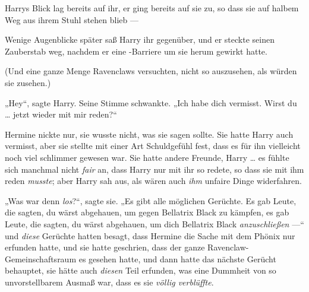 Harrys Blick lag bereits auf ihr, er ging bereits auf sie zu, so dass sie auf halbem Weg aus ihrem Stuhl stehen blieb —

Wenige Augenblicke später saß Harry ihr gegenüber, und er steckte seinen Zauberstab weg, nachdem er eine -Barriere um sie herum gewirkt hatte.

(Und eine ganze Menge Ravenclaws versuchten, nicht so auszusehen, als würden sie zusehen.)

„Hey“, sagte Harry. Seine Stimme schwankte.
„Ich habe dich vermisst. Wirst du … jetzt wieder mit mir reden?“

Hermine nickte nur, sie wusste nicht, was sie sagen sollte. Sie hatte Harry auch vermisst, aber sie stellte mit einer Art Schuldgefühl fest, dass es für ihn vielleicht noch viel schlimmer gewesen war. Sie hatte andere Freunde, Harry … es fühlte sich manchmal nicht \emph{fair} an, dass Harry nur mit ihr so redete, so dass sie mit ihm reden \emph{musste}; aber Harry sah aus, als wären auch \emph{ihm} unfaire Dinge widerfahren.

„Was war denn \emph{los}?“, sagte sie.
„Es gibt alle möglichen Gerüchte. Es gab Leute, die sagten, du wärst abgehauen, um gegen Bellatrix Black zu kämpfen, es gab Leute, die sagten, du wärst abgehauen, um dich Bellatrix Black \emph{anzuschließen} —“ und \emph{diese} Gerüchte hatten besagt, dass Hermine die Sache mit dem Phönix nur erfunden hatte, und sie hatte geschrien, dass der ganze Ravenclaw-Gemeinschaftsraum es gesehen hatte, und dann hatte das nächste Gerücht behauptet, sie hätte auch \emph{diesen} Teil erfunden, was eine Dummheit von so unvorstellbarem Ausmaß war, dass es sie \emph{völlig verblüffte}.

